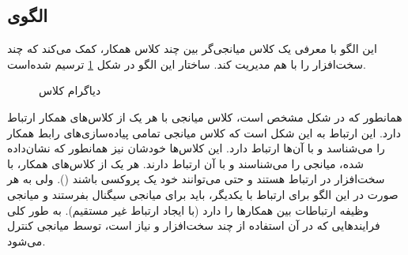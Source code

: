 \subsection{الگوی }
\label{HWMediatorSec}
\begin{RTL}
این الگو با معرفی یک کلاس میانجی‌گر بین چند کلاس همکار، کمک می‌کند که چند
سخت‌افزار را با هم مدیریت کند. ساختار این الگو در شکل \ref{HWMediatorClassDiag}
ترسیم شده‌است.
\end{RTL}
\begin{figure}[h!]
\centering
{}
\caption{دیاگرام کلاس }
\label{HWMediatorClassDiag}
\end{figure}
\begin{RTL}
همانطور که در شکل مشخص است، کلاس میانجی با هر یک از کلاس‌های همکار ارتباط دارد.
این ارتباط به این شکل است که کلاس میانجی تمامی پیاده‌سازی‌های رابط همکار را می‌شناسد
و با آن‌ها ارتباط دارد. این کلاس‌ها خودشان نیز همانطور که نشان‌داده شده،
میانجی را می‌شناسند و با آن ارتباط دارند.
هر یک از کلاس‌های همکار، با سخت‌افزار در ارتباط هستند و حتی می‌توانند خود یک پروکسی
باشند ().
ولی به هر صورت در این الگو برای ارتباط با یکدیگر، باید برای میانجی سیگنال
بفرستند و میانجی وظیفه ارتباطات بین همکارها را دارد (با ایجاد ارتباط غیر مستقیم).
به طور کلی فرایندهایی که در آن
استفاده از چند سخت‌افزار و نیاز است، توسط میانجی کنترل می‌شود.
\end{RTL}